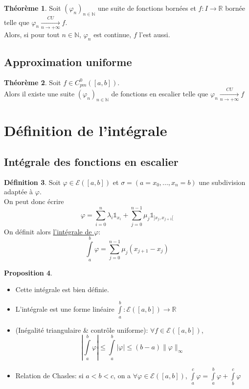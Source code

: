 \documentclass[10pt,a4paper]{article}
\theoremstyle{definition}
\newtheorem{proposition}{Proposition}[section]
\newtheorem{theorem}[proposition]{Théorème}
\newtheorem{definition}[proposition]{Définition}
\begin{document}
\begin{theorem}
Soit $(\varphi_n)_{n \in \mathbb{N}}$ une suite de fonctions bornées et $f: I \to \mathbb{R}$ bornée telle que $\varphi_n \xrightarrow[n \to +\infty]{CU} f$. \\
Alors, si pour tout $n \in \mathbb{N}$, $\varphi_n$ est continue, $f$ l'est aussi. 
\end{theorem}

\subsection{Approximation uniforme}
\begin{theorem}
Soit $f \in C^{0}_{pm}([a, b])$. \\
Alors il existe une suite $(\varphi_n)_{n \in \mathbb{N}}$ de fonctions en escalier telle que $\varphi_n \xrightarrow[n \to +\infty]{CU} f$
\end{theorem}

\section{Définition de l'intégrale}
\subsection{Intégrale des fonctions en escalier}
\begin{definition}
Soit $\varphi \in \mathcal{E}([a, b])$ et $\sigma = (a = x_0, ... , x_n = b)$ une subdivision adaptée à $\varphi$. \\
On peut donc écrire 
\[\varphi = \sum\limits_{i=0}^{n} \lambda_i \mathds{1}_{x_i} + \sum\limits_{j=0}^{n-1} \mu_j \mathds{1}_{]x_j, x_{j+1}[}\]
On définit alors \uline{l'intégrale de $\varphi$}: 
\[\int\limits_a^b \varphi = \sum\limits_{j=0}^{n-1} \mu_j (x_{j+1} - x_j)\]
\end{definition}
\begin{proposition}
\hfill
\begin{itemize}
\item Cette intégrale est bien définie.
\item L'intégrale est une forme linéaire $\int\limits_a^b : \mathcal{E}([a, b]) \to \mathbb{R}$
\item (Inégalité triangulaire \textnormal{\&} contrôle uniforme): $ \forall f \in \mathcal{E}([a, b])$,
\[\left|\int\limits_a^b \varphi \right| \leq \int\limits_a^b |\varphi| \leq (b - a)\lVert \varphi \rVert_\infty\]
\item Relation de Chasles: si $a < b < c$, on a $\forall \varphi \in \mathcal{E}([a, b])$, $\int\limits_a^c \varphi = \int\limits_a^b \varphi + \int\limits_b^c \varphi$
\end{itemize}
\end{proposition}
\end{document}
